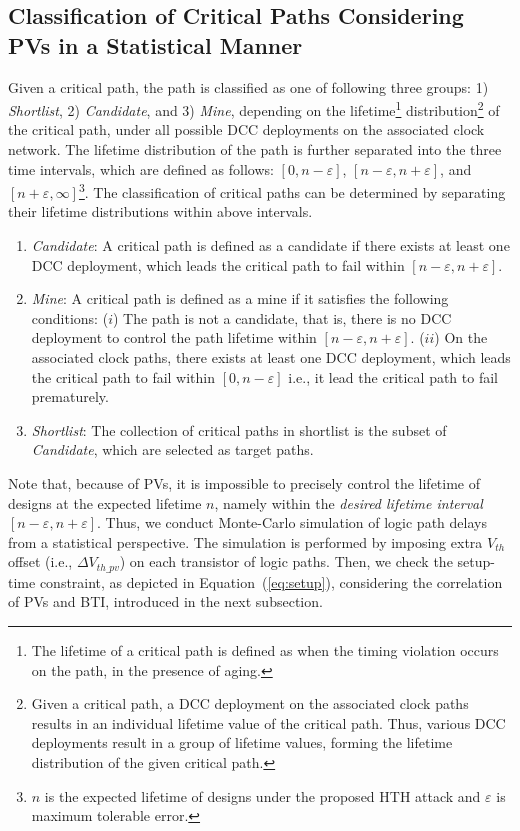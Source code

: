 \subsection{Classification of Critical Paths Considering PVs in a Statistical Manner}
\label{sec:frame:cp}
Given a critical path, the path is classified as one of following three groups: 1) \textit{Shortlist}, 2) \textit{Candidate}, and 3) \textit{Mine}, depending on the lifetime\footnote{The lifetime of a critical path is defined as when the timing violation occurs on the path, in the presence of aging.} distribution\footnote{Given a critical path, a DCC deployment on the associated clock paths results in an individual lifetime value of the critical path. Thus, various DCC deployments result in a group of lifetime values, forming the lifetime distribution of the given critical path.} of the critical path, under all possible DCC deployments on the associated clock network. The lifetime distribution of the path is further separated into the three time intervals, which are defined as follows: $[0, n - \varepsilon]$, $[n - \varepsilon, n + \varepsilon]$, and $[n + \varepsilon, \infty]$\footnote{$n$ is the expected lifetime of designs under the proposed HTH attack and $\varepsilon$ is maximum tolerable error.}. The classification of critical paths can be determined by separating their lifetime distributions within above intervals. 
\begin{enumerate}[leftmargin=*]%
	\item \textit{Candidate}: A critical path is defined as a candidate if there exists at least one DCC deployment, which leads the critical path to fail within $[n - \varepsilon, n + \varepsilon]$.
	\item \textit{Mine}: A critical path is defined as a mine if it satisfies the following conditions: ($i$) The path is not a candidate, that is, there is no DCC deployment to control the path lifetime within $[n - \varepsilon, n + \varepsilon]$. ($ii$) On the associated clock paths, there exists at least one DCC deployment, which leads the critical path to fail within $[0, n - \varepsilon]$ i.e., it lead the critical path to fail prematurely.
	\item \textit{Shortlist}:  The collection of critical paths in shortlist is the subset of \textit{Candidate}, which are selected as target paths.
\end{enumerate}

Note that, because of PVs, it is impossible to precisely control the lifetime of designs at the expected lifetime $n$, namely within the \textit{desired lifetime interval}  $[n - \varepsilon, n + \varepsilon]$. Thus, we conduct Monte-Carlo simulation of logic path delays from a statistical perspective. The simulation is performed by imposing extra $V_{th}$ offset (i.e., $\Delta V_{th\_pv}$) on each transistor of logic paths. Then, we check the setup-time constraint, as depicted in Equation~(\ref{eq:setup}), considering the correlation of PVs and BTI, introduced in the next subsection. 

